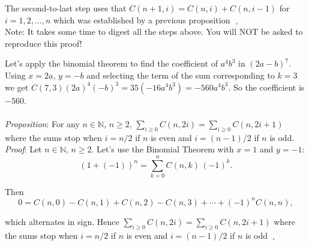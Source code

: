 \documentclass[12pt]{amsart}
\theoremstyle{definition}
\theoremstyle{remark}
\newcommand{\nats}{\mathbb N}
\begin{document}
The second-to-last step uses that $C(n+1,i)=C(n,i)+C(n,i-1)$ for $i=1,2,...,n$ which was established by a previous proposition$\mbox{ }_{\square}$\\

Note:  It takes some time to digest all the steps above.  You will NOT be asked to reproduce this proof!\\


\newpage

Let's apply the binomial theorem to find the coefficient of $a^{4}b^{3}$ in $(2a-b)^{7}$.\\

Using $x=2a$, $y=-b$ and selecting the term of the sum corresponding to $k=3$ we get $C(7,3)(2a)^{4}(-b)^{3}=35(-16a^{4}b^{3})=-560a^{4}b^{3}$.  So the coefficient is $-560$.\\ \\

\emph{Proposition}:  For any $n\in\nats$, $n\geq 2$, $\displaystyle \sum_{i\geq 0}C(n,2i)=\sum_{i\geq 0}C(n,2i+1)$ where the sums stop when $i=n/2$ if $n$ is even and $i=(n-1)/2$ if $n$ is odd.\\

\emph{Proof}:  Let $n\in\nats$, $n\geq 2$.  Let's use the Binomial Theorem with $x=1$ and $y=-1$:  $$(1+(-1))^n=\sum_{k=0}^{n}{C(n,k)\, (-1)^{k}}.$$

Then $$0=C(n,0)-C(n,1)+C(n,2)-C(n,3)+\cdots +(-1)^n C(n,n),$$

which alternates in sign.  Hence $\displaystyle \sum_{i\geq 0} C(n,2i)=\sum_{i\geq 0}C(n,2i+1)$ where the sums stop when $i=n/2$ if $n$ is even and $i=(n-1)/2$ if $n$ is odd $\;_{\square}$ \\ \\
\end{document}
